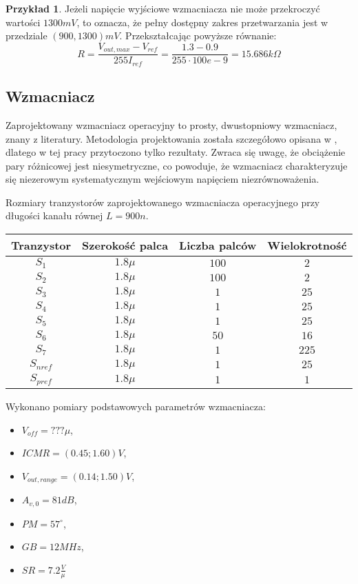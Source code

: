 \documentclass[10pt,a4paper,twoside]{report}
\theoremstyle{definition}
\theoremstyle{definition}
\theoremstyle{definition}
\newtheorem{przyklad}{Przykład}[section]
\theoremstyle{definition}
\theoremstyle{definition}
\begin{document}
{{{{{{{{\begin{przyklad}
	{ Jeżeli napięcie wyjściowe wzmacniacza nie może przekroczyć wartości $1300mV$, to oznacza, że pełny dostępny zakres przetwarzania jest w przedziale $(900,1300)mV$. Przekształcając powyższe równanie:
	\begin{equation}
		R = \frac{V_{out,max} -  V_{ref}}{255  I_{ref} } = \frac{1.3-0.9}{255 \cdot 100e-9} = 15.686k\Omega
	\end{equation}	
	}
	\end{przyklad}}

	\subsection{Wzmacniacz}
	{	Zaprojektowany wzmacniacz operacyjny to prosty, dwustopniowy wzmacniacz, znany z literatury. Metodologia projektowania została szczegółowo opisana w \cite{cmosanal}, dlatego w tej pracy przytoczono tylko rezultaty. Zwraca się uwagę, że obciążenie pary różnicowej jest niesymetryczne, co powoduje, że wzmacniacz charakteryzuje się niezerowym systematycznym wejściowym napięciem niezrównoważenia. }
	{	Rozmiary tranzystorów zaprojektowanego wzmacniacza operacyjnego przy długości kanału równej $L=900n$. 
	\begin{center}
	\begin{tabular}{|c|c|c|c|}
		\hline 
		Tranzystor & Szerokość palca & Liczba palców & Wielokrotność \\ 
		\hline 
		$S_1$ & $1.8\mu$ & $100$ & $2$ \\ 
		\hline 
		$S_2$ & $1.8\mu$ & $100$ & $2$ \\ 
		\hline 
		$S_3$ & $1.8\mu$ & $1$ & $25$ \\ 
		\hline 
		$S_4$ & $1.8\mu$ & $1$ & $25$ \\ 
		\hline 
		$S_5$ & $1.8\mu$ & $1$ & $25$ \\ 
		\hline 
		$S_6$ & $1.8\mu$ & $50$ & $16$ \\ 
		\hline 
		$S_7$ & $1.8\mu$ & $1$ & $225$ \\ 
		\hline 
		$S_{nref}$ & $1.8\mu$ & $1$ & $25$ \\ 
		\hline 
		$S_{pref}$ & $1.8\mu$ & $1$ & $1$ \\ 
		\hline 
		\end{tabular} 
	\end{center}
	}
		Wykonano pomiary podstawowych parametrów wzmacniacza:
		\begin{itemize}
			\item $ V_{off} = ??? \mu$,
			\item $ ICMR = (0.45;1.60)V$,
			\item $ V_{out,range} = (0.14;1.50)V$,
			\item $ A_{v,0} =  81dB$,
			\item $ PM = 57^\circ$,
			\item $ GB = 12MHz$,
			\item $ SR = 7.2 \frac{V}{\mu} $



\end{itemize}}}}}}}}
\end{document}
